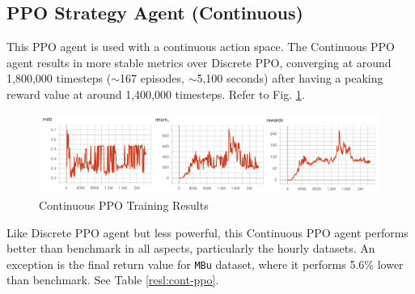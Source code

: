 \subsection{PPO Strategy Agent (Continuous)}
This PPO agent is used with a continuous action space. The Continuous PPO agent results in more stable metrics over Discrete PPO, converging at around 1,800,000 timesteps ($\sim$167 episodes, $\sim$5,100 seconds) after having a peaking reward value at around 1,400,000 timesteps. Refer to Fig. \ref{gr:ppoc:train}.

\begin{figure}[H]
    \centering
    \includegraphics[width=0.99\textwidth]{graphics/trainphoto/ppoctrain.png}
    \caption{Continuous PPO Training Results}
    \label{gr:ppoc:train}
\end{figure}

Like Discrete PPO agent but less powerful, this Continuous PPO agent performs better than benchmark in all aspects, particularly the hourly datasets. An exception is the final return value for \texttt{MBu} dataset, where it performs 5.6\% lower than benchmark. See Table \ref{resl:cont-ppo}.

